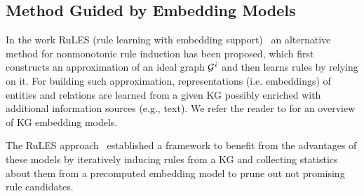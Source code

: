 


\subsection{Method Guided by Embedding Models}



In the work RuLES (rule learning with embedding support)~\cite{thinh2018} an alternative method for nonmonotonic rule induction has been proposed, which first constructs an approximation of an ideal graph $\mathcal{G}^i$ and then learns rules by relying on it. For building such approximation, representations (i.e. embeddings) of entities and relations are learned from a given KG possibly enriched with additional information sources (e.g., text). We refer the reader to \cite{Wang2017} for an overview of KG embedding models. %

The RuLES approach~\cite{thinh2018} established a framework to benefit from the advantages of these models %
by iteratively inducing rules from a KG and collecting statistics about them from a precomputed embedding model to prune out not promising rule candidates.

